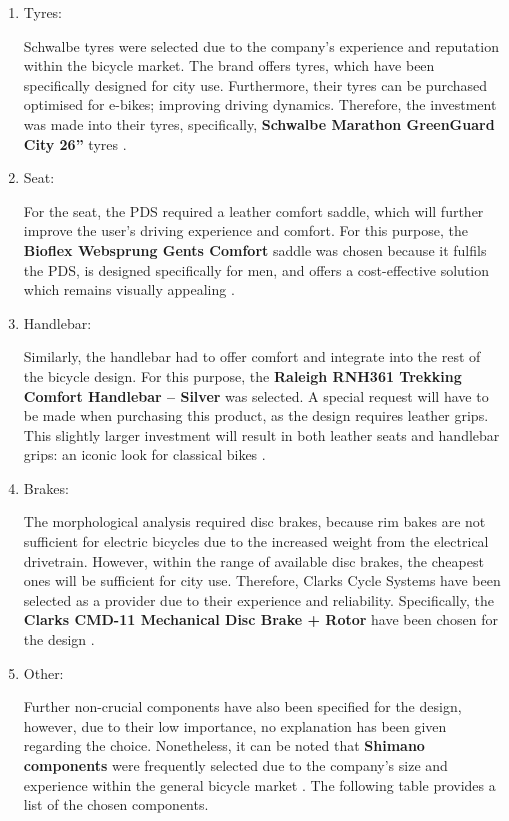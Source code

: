 \documentclass[a4paper,11pt]{article}
\begin{document}
\begin{enumerate}[leftmargin=0pt, itemindent=20pt,labelwidth=15pt, labelsep=5pt, listparindent=0.7cm,align=left]
	\item Tyres:
		
		Schwalbe tyres were selected due to the company's experience and reputation within the bicycle market. The brand offers tyres, which have been specifically designed for city use. Furthermore, their tyres can be purchased optimised for e-bikes; improving driving dynamics. Therefore, the investment was made into their tyres, specifically, \textbf{Schwalbe Marathon GreenGuard City 26''} tyres \cite{schwalbe18}. 

	\item Seat:

		For the seat, the PDS required a leather comfort saddle, which will further improve the user's driving experience and comfort. For this purpose, the \textbf{Bioflex Websprung Gents Comfort} saddle was chosen because it fulfils the PDS, is designed specifically for men, and offers a cost-effective solution which remains visually appealing \cite{bioflex18}. 

	\item Handlebar:

		Similarly, the handlebar had to offer comfort and integrate into the rest of the bicycle design. For this purpose, the \textbf{Raleigh RNH361 Trekking Comfort Handlebar -- Silver} was selected. A special request will have to be made when purchasing this product, as the design requires leather grips. This slightly larger investment will result in both leather seats and handlebar grips: an iconic look for classical bikes \cite{raleigh18}. 

	\item Brakes:

		The morphological analysis required disc brakes, because rim bakes are not sufficient for electric bicycles due to the increased weight from the electrical drivetrain. However, within the range of available disc brakes, the cheapest ones will be sufficient for city use. Therefore, Clarks Cycle Systems have been selected as a provider due to their experience and reliability. Specifically, the \textbf{Clarks CMD-11 Mechanical Disc Brake + Rotor} have been chosen for the design \cite{clarks18}. 

	\item Other:

		Further non-crucial components have also been specified for the design, however, due to their low importance, no explanation has been given regarding the choice. Nonetheless, it can be noted that \textbf{Shimano components} were frequently selected due to the company's size and experience within the general bicycle market \cite{shimano18}. The following table provides a list of the chosen components.
\end{enumerate}
\end{document}
